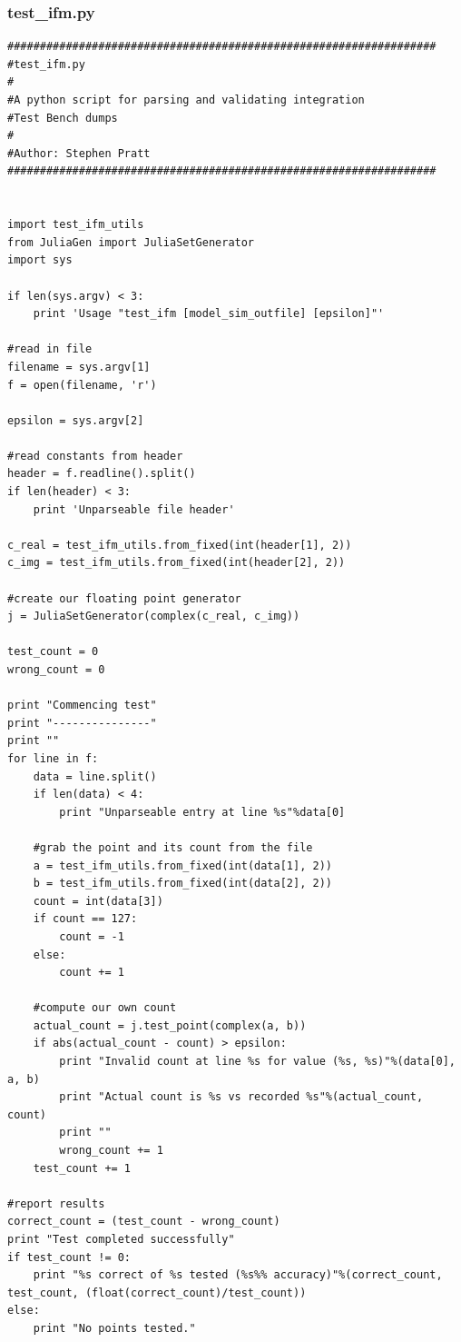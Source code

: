 \documentclass{article}
\begin{document}
\subsubsection{test\_ifm.py}						%
\begin{lstlisting}
##################################################################
#test_ifm.py
#
#A python script for parsing and validating integration
#Test Bench dumps
#
#Author: Stephen Pratt
##################################################################


import test_ifm_utils
from JuliaGen import JuliaSetGenerator
import sys

if len(sys.argv) < 3:
	print 'Usage "test_ifm [model_sim_outfile] [epsilon]"'

#read in file
filename = sys.argv[1]
f = open(filename, 'r')

epsilon = sys.argv[2]

#read constants from header
header = f.readline().split()
if len(header) < 3:
	print 'Unparseable file header'

c_real = test_ifm_utils.from_fixed(int(header[1], 2))
c_img = test_ifm_utils.from_fixed(int(header[2], 2))

#create our floating point generator
j = JuliaSetGenerator(complex(c_real, c_img))

test_count = 0
wrong_count = 0

print "Commencing test"	
print "---------------"
print ""	
for line in f:
	data = line.split()
	if len(data) < 4:
		print "Unparseable entry at line %s"%data[0]

	#grab the point and its count from the file
	a = test_ifm_utils.from_fixed(int(data[1], 2))
	b = test_ifm_utils.from_fixed(int(data[2], 2))
	count = int(data[3])
	if count == 127:
		count = -1
	else:
		count += 1

	#compute our own count
	actual_count = j.test_point(complex(a, b))
	if abs(actual_count - count) > epsilon:
		print "Invalid count at line %s for value (%s, %s)"%(data[0], a, b)
		print "Actual count is %s vs recorded %s"%(actual_count, count)
		print ""
		wrong_count += 1
	test_count += 1

#report results
correct_count = (test_count - wrong_count)	
print "Test completed successfully"
if test_count != 0:		
	print "%s correct of %s tested (%s%% accuracy)"%(correct_count, test_count, (float(correct_count)/test_count))
else:
	print "No points tested."
\end{lstlisting}
\end{document}
